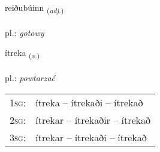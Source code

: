 \documentclass[frontgrid, backgrid]{flacards}\usepackage[]{graphicx}\usepackage[]{xcolor}
\begin{document}
\renewcommand{\flhead}{\vskip5pt \fboxsep=0pt {\small\bfseries\footnotesize Lýsingarorð | przymiotnik}}
\renewcommand{\fcfoot}{\vskip5pt \fboxsep=0pt \hspace{2pt}{\small\bfseries\footnotesize 3K}}

\renewcommand{\blhead}{\vskip5pt {\small\bfseries\footnotesize Lýsingarorð | przymiotnik }}
\renewcommand{\bcfoot}{\vskip5pt \hspace{2pt}{\small\bfseries\footnotesize 3K}}


{reiðubúinn \small{\textsubscript{(\textit{adj.})}} \\[1ex] %
\textphonetic{[reiːðʏpuɪn]} \\
pl.: \emph{gotowy} \\  [2ex]
\renewcommand*{\arraystretch}{0.8}
}

\renewcommand{\flhead}{\vskip5pt \fboxsep=0pt {\small\bfseries\footnotesize Sagnorð | czasownik}}
\renewcommand{\fcfoot}{\vskip5pt \fboxsep=0pt \hspace{2pt}{\small\bfseries\footnotesize 3K}}

\renewcommand{\blhead}{\vskip5pt {\small\bfseries\footnotesize Sagnorð | czasownik }}
\renewcommand{\bcfoot}{\vskip5pt \hspace{2pt}{\small\bfseries\footnotesize 3K}}


{ítreka \small{\textsubscript{(\textit{v.})}} \\[1ex] %
\textphonetic{[iːtrɛka]} \\
pl.: \emph{powtarzać} \\  [2ex]
\renewcommand*{\arraystretch}{0.8}
\begin{tabular}{p{1cm}l}
\textsc{1sg}: & ítreka -- ítrekaði -- ítrekað \\ 
\textsc{2sg}: & ítrekar -- ítrekaðir -- ítrekað \\ 
\textsc{3sg}: & ítrekar -- ítrekaði -- ítrekað \\ 
\end{tabular}
}
\end{document}
